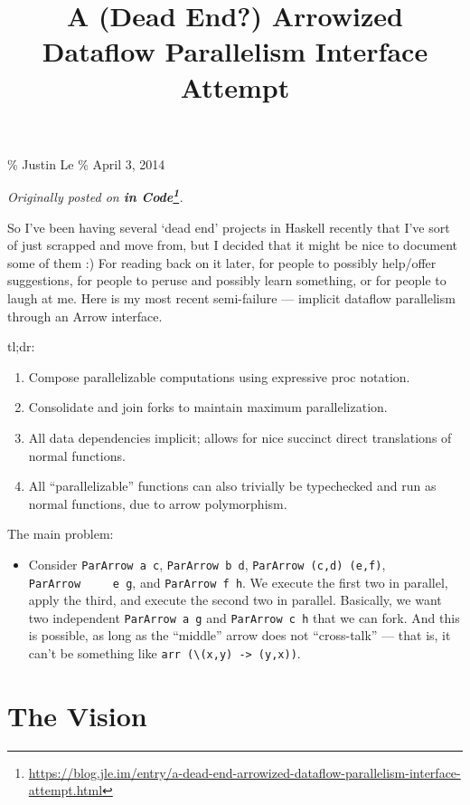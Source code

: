 \documentclass[]{article}
\title{A (Dead End?) Arrowized Dataflow Parallelism Interface Attempt}
\renewcommand{\href}[2]{#2\footnote{\url{#1}}}
\begin{document}
\maketitle

\% Justin Le \% April 3, 2014

\emph{Originally posted on
\textbf{\href{https://blog.jle.im/entry/a-dead-end-arrowized-dataflow-parallelism-interface-attempt.html}{in
Code}}.}

So I've been having several `dead end' projects in Haskell recently that I've
sort of just scrapped and move from, but I decided that it might be nice to
document some of them :) For reading back on it later, for people to possibly
help/offer suggestions, for people to peruse and possibly learn something, or
for people to laugh at me. Here is my most recent semi-failure --- implicit
dataflow parallelism through an Arrow interface.

tl;dr:

\begin{enumerate}
\def\labelenumi{\arabic{enumi}.}
\tightlist
\item
  Compose parallelizable computations using expressive proc notation.
\item
  Consolidate and join forks to maintain maximum parallelization.
\item
  All data dependencies implicit; allows for nice succinct direct translations
  of normal functions.
\item
  All ``parallelizable'' functions can also trivially be typechecked and run as
  normal functions, due to arrow polymorphism.
\end{enumerate}

The main problem:

\begin{itemize}
\tightlist
\item
  Consider \texttt{ParArrow\ a\ c}, \texttt{ParArrow\ b\ d},
  \texttt{ParArrow\ (c,d)\ (e,f)}, \texttt{ParArrow\ \ \ \ \ e\ g}, and
  \texttt{ParArrow\ f\ h}. We execute the first two in parallel, apply the
  third, and execute the second two in parallel. Basically, we want two
  independent \texttt{ParArrow\ a\ g} and \texttt{ParArrow\ c\ h} that we can
  fork. And this is possible, as long as the ``middle'' arrow does not
  ``cross-talk'' --- that is, it can't be something like
  \texttt{arr\ (\textbackslash{}(x,y)\ -\textgreater{}\ (y,x))}.
\end{itemize}

\section{The Vision}\label{the-vision}
\end{document}
